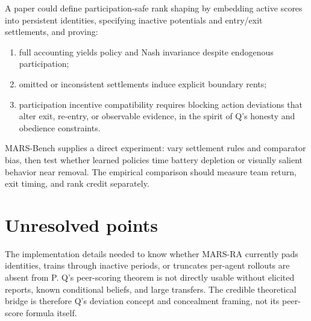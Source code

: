 \documentclass{article}
\begin{document}
A paper could define participation-safe rank shaping by embedding active scores into persistent identities, specifying inactive potentials and entry/exit settlements, and proving:

\begin{enumerate}
\item full accounting yields policy and Nash invariance despite endogenous participation;
\item omitted or inconsistent settlements induce explicit boundary rents;
\item participation incentive compatibility requires blocking action deviations that alter exit, re-entry, or observable evidence, in the spirit of Q's honesty and obedience constraints.
\end{enumerate}

MARS-Bench supplies a direct experiment: vary settlement rules and comparator bias, then test whether learned policies time battery depletion or visually salient behavior near removal. The empirical comparison should measure team return, exit timing, and rank credit separately.

\section{Unresolved points}

The implementation details needed to know whether MARS-RA currently pads identities, trains through inactive periods, or truncates per-agent rollouts are absent from P. Q's peer-scoring theorem is not directly usable without elicited reports, known conditional beliefs, and large transfers. The credible theoretical bridge is therefore Q's deviation concept and concealment framing, not its peer-score formula itself.
\end{document}
